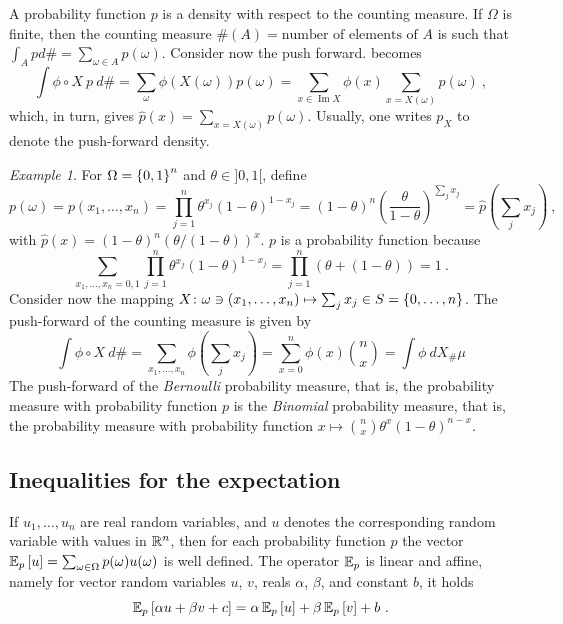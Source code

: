 \documentclass[12pt,a4paper]{amsart}
\theoremstyle{plain}%
\theoremstyle{definition}
\theoremstyle{remark}
\newtheorem{example}{Example}
\begin{document}
A probability function $p$ is a density with respect to the counting measure. If $\Omega$ is finite, then the counting measure $\#(A) = \text{number of elements of $A$}$ is such that $\int_A p d\# = \sum_{\omega \in A} p(\omega)$. Consider now the push forward.  becomes
\begin{equation*}
  \int \phi \circ X \ p \ d\# = \sum_\omega \phi(X(\omega)) p(\omega) = \sum_{x \in \operatorname{Im}X} \phi(x) \sum_{x = X(\omega)} p(\omega) \ ,
\end{equation*}
which, in turn, gives $\hat p(x) = \sum_{x = X(\omega)} p(\omega)$. Usually, one writes $p_X$ to denote the push-forward density.

\begin{example}
  For $\Omega = \left\{0,1\right\}^n$ and $\theta \in ]0,1[$, define
  \begin{equation*}
    p(\omega) = p(x_1,\dots,x_n) = \prod_{j=1}^n \theta^{x_j} (1 - \theta)^{1-x_j} = (1-\theta)^n \left(\frac{\theta}{1-\theta}\right)^{\sum_j x_j} = \hat p \left(\sum_j x_j\right) \ ,
  \end{equation*}
with $\hat p(x) = (1-\theta)^n (\theta/(1-\theta))^x$. $p$ is a probability function because
\begin{equation*}
  \sum_{x_1,\dots,x_n = 0,1} \prod_{j=1}^n \theta^{x_j} (1 - \theta)^{1-x_j} = \prod_{j=1}^n (\theta + (1 - \theta))
  = 1 \ .
\end{equation*}
Consider now the mapping $X \colon \omega \ni (x_1,\dots,x_n) \mapsto \sum_j x_j \in S = \left\{0,\dots,n\right\}$. The push-forward of the counting measure is given by
\begin{equation*}
  \int \phi \circ X \ d\# = \sum_{x_1,\dots,x_n} \phi\left(\sum_j x_j\right)  = \sum_{x=0}^n \phi(x) \binom n x = \int \phi \ dX_\# \mu 
\end{equation*}
The push-forward of the \emph{Bernoulli} probability measure, that is, the probability measure with probability function $p$ is the \emph{Binomial} probability measure, that is, the probability measure with probability function $x \mapsto \binom n x \theta^x (1-\theta)^{n-x}$.
\end{example}

\subsection{Inequalities for the expectation}
\label{sec:ineg-expect}

If $u_1,\dots,u_n$ are real random variables, and $u$ denotes the corresponding random variable with values in $\mathbb{R}^n$, then for each probability function $p$ the vector $\operatorname{\mathbb E}_{p}\left[u\right] = \sum_{\omega\in\Omega} p(\omega) u(\omega)$ is well defined. The operator $\operatorname{\mathbb E}_p$ is linear and affine, namely for vector random variables $u$, $v$, reals $\alpha$, $\beta$, and constant $b$, it holds
\begin{equation*}
  \operatorname{\mathbb E}_{p}\left[\alpha u + \beta v + c\right] = \alpha \operatorname{\mathbb E}_{p}\left[u\right] + \beta \operatorname{\mathbb E}_{p}\left[v\right] + b \ .
\end{equation*}
\end{document}
